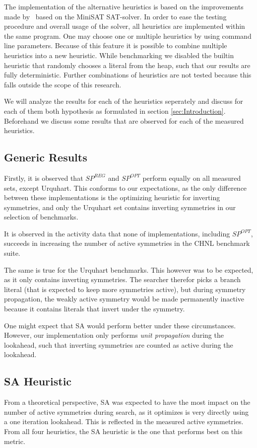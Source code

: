 The implementation of the alternative heuristics is based on the improvements
made by~\cite{devriendt2012symmetry} based on the MiniSAT SAT-solver.
In order to ease the testing procedure and overall usage of the solver, all heuristics
are implemented within the same program. One may choose one or multiple heuristics
by using command line parameters. Because of this feature it is possible to combine
multiple heuristics into a new heuristic.
While benchmarking we disabled the builtin heuristic that randomly chooses a literal from the heap,
such that our results are fully deterministic.
Further combinations of heuristics are not tested because this falls outside the scope
of this research.

We will analyze the results for each of the heuristics seperately and discuss for each of them both
hypothesis as formulated in section \ref{sec:Introduction}.
Beforehand we discuss some results that are observed for each of the measured heuristics.

\subsection{Generic Results}
	Firstly, it is observed that $SP^{REG}$ and $SP^{OPT}$ perform equally on all measured sets,
	except Urquhart.
	This conforms to our expectations, as the only difference between these implementations is the
	optimizing heuristic for inverting symmetries, and only the Urquhart set contains inverting
	symmetries in our selection of benchmarks.

	It is observed in the activity data that none of implementations, including $SP^{OPT}$,
	succeeds in increasing the number of active symmetries in the CHNL benchmark suite.

	The same is true for the Urquhart benchmarks.
	This however was to be expected, as it only contains inverting symmetries.
	The searcher therefor picks a branch literal (that is expected to keep more symmetries active),
	but during symmetry propagation, the weakly active symmetry would be made permanently inactive
	because it contains literals that invert under the symmetry.

	One might expect that SA would perform better under these circumstances.
	However, our implementation only performs \emph{unit propagation} during the lookahead, such
	that inverting symmetries are counted as active during the lookahead.

\subsection{SA Heuristic}
	From a theoretical perspective, SA was expected to have the most impact on the number of active
	symmetries during search, as it optimizes is very directly using a one iteration lookahead.
	This is reflected in the measured active symmetries.
	From all four heuristics, the SA heuristic is the one that performs best on this metric.

